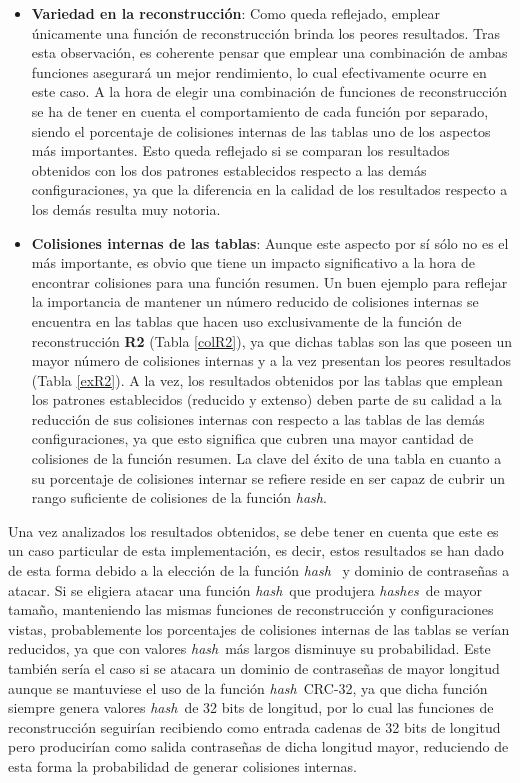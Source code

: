 \documentclass[12pt,spanish,listoffigures,listoftables,listofalgorithms]{tfgetsinf}
\newcommand{\hash}{\textit{hash}}
\newcommand{\hashes}{\textit{hashes}}
\begin{document}
\begin{itemize}

    \item \textbf{Variedad en la reconstrucción}: Como queda reflejado, emplear únicamente una función de reconstrucción brinda los peores resultados. Tras esta observación, es coherente pensar que emplear una combinación de ambas funciones asegurará un mejor rendimiento, lo cual efectivamente ocurre en este caso. A la hora de elegir una combinación de funciones de reconstrucción se ha de tener en cuenta el comportamiento de cada función por separado, siendo el porcentaje de colisiones internas de las tablas uno de los aspectos más importantes. Esto queda reflejado si se comparan los resultados obtenidos con los dos patrones establecidos respecto a las demás configuraciones, ya que la diferencia en la calidad de los resultados respecto a los demás resulta muy notoria.
    
	\item \textbf{Colisiones internas de las tablas}: Aunque este aspecto por sí sólo no es el más importante, es obvio que tiene un impacto significativo a la hora de encontrar colisiones para una función resumen. Un buen ejemplo para reflejar la importancia de mantener un número reducido de colisiones internas se encuentra en las tablas que hacen uso exclusivamente de la función de reconstrucción \textbf{R2} (Tabla \ref{colR2}), ya que dichas tablas son las que poseen un mayor número de colisiones internas y a la vez presentan los peores resultados (Tabla \ref{exR2}). A la vez, los resultados obtenidos por las tablas que emplean los patrones establecidos (reducido y extenso) deben parte de su calidad a la reducción de sus colisiones internas con respecto a las tablas de las demás configuraciones, ya que esto significa que cubren una mayor cantidad de colisiones de la función resumen. La clave del éxito de una tabla en cuanto a su porcentaje de colisiones internar se refiere reside en ser capaz de cubrir un rango suficiente de colisiones de la función \hash.
    
\end{itemize}

Una vez analizados los resultados obtenidos, se debe tener en cuenta que este es un caso particular de esta implementación, es decir, estos resultados se han dado de esta forma debido a la elección de la función \hash~ y dominio de contraseñas a atacar. Si se eligiera atacar una función \hash~que produjera \hashes~de mayor tamaño, manteniendo las mismas funciones de reconstrucción y configuraciones vistas, probablemente los porcentajes de colisiones internas de las tablas se verían reducidos, ya que con valores \hash~más largos disminuye su probabilidad. Este también sería el caso si se atacara un dominio de contraseñas de mayor longitud aunque se mantuviese el uso de la función \hash~CRC-32, ya que dicha función siempre genera valores \hash~de 32 bits de longitud, por lo cual las funciones de reconstrucción seguirían recibiendo como entrada cadenas de 32 bits de longitud pero producirían como salida contraseñas de dicha longitud mayor, reduciendo de esta forma la probabilidad de generar colisiones internas.
\end{document}

